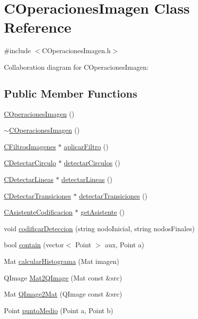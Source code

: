 \hypertarget{classCOperacionesImagen}{}\section{C\+Operaciones\+Imagen Class Reference}
\label{classCOperacionesImagen}


{\ttfamily \#include $<$C\+Operaciones\+Imagen.\+h$>$}



Collaboration diagram for C\+Operaciones\+Imagen\+:
\subsection*{Public Member Functions}
\begin{DoxyCompactItemize}
\item 
\hyperlink{classCOperacionesImagen_ae79f327bbdfdf61e555b78f68351afa4}{C\+Operaciones\+Imagen} ()
\item 
\hyperlink{classCOperacionesImagen_a876e87d4477e3547b82d24ddea188f7b}{$\sim$\+C\+Operaciones\+Imagen} ()
\item 
\hyperlink{classCFiltrosImagenes}{C\+Filtros\+Imagenes} $\ast$ \hyperlink{classCOperacionesImagen_a4a2bc277c960648dc2a88aa49e6a4d28}{aplicar\+Filtro} ()
\item 
\hyperlink{classCDetectarCirculo}{C\+Detectar\+Circulo} $\ast$ \hyperlink{classCOperacionesImagen_a8284a380dae8383e63c85fcc9b4aff04}{detectar\+Circulos} ()
\item 
\hyperlink{classCDetectarLineas}{C\+Detectar\+Lineas} $\ast$ \hyperlink{classCOperacionesImagen_a0dbb1c8970ca701b6af7bb45dc2a912a}{detectar\+Lineas} ()
\item 
\hyperlink{classCDetectarTransiciones}{C\+Detectar\+Transiciones} $\ast$ \hyperlink{classCOperacionesImagen_a9e025ecb29931b9e472e2989b4ee50a2}{detectar\+Transiciones} ()
\item 
\hyperlink{classCAsistenteCodificacion}{C\+Asistente\+Codificacion} $\ast$ \hyperlink{classCOperacionesImagen_a28f7cbaaff0e626d6f94be6edbe900b8}{get\+Asistente} ()
\item 
void \hyperlink{classCOperacionesImagen_aaac35f5fc47a2a7c8abb8d00fc89879a}{codificar\+Deteccion} (string nodo\+Inicial, string nodos\+Finales)
\item 
bool \hyperlink{classCOperacionesImagen_ae0b1cc753d1c4f62a2c9dce6f213ba95}{contain} (vector$<$ Point $>$ aux, Point a)
\item 
Mat \hyperlink{classCOperacionesImagen_aa40399f6525ea0e3b76a246e5cccdc06}{calcular\+Histograma} (Mat imagen)
\item 
Q\+Image \hyperlink{classCOperacionesImagen_a81462b6d034a47905ff9ea337349042e}{Mat2\+Q\+Image} (Mat const \&src)
\item 
Mat \hyperlink{classCOperacionesImagen_a9aa86962598a4354e95168ee6645e4e7}{Q\+Image2\+Mat} (Q\+Image const \&src)
\item 
Point \hyperlink{classCOperacionesImagen_a677a389169905ef82c72251a61b9e6c4}{punto\+Medio} (Point a, Point b)
\end{DoxyCompactItemize}
